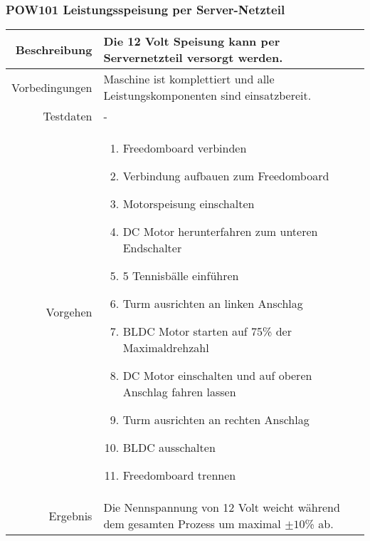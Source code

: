 \subsubsection{POW101 Leistungsspeisung per Server-Netzteil}
\begin{table}[h!]
	\renewcommand{\arraystretch}{1.5}
	\begin{tabular}{|r|p{13cm}|}
		\hline Beschreibung	&
			Die 12 Volt Speisung kann per Servernetzteil versorgt werden. \\ 
		\hline Vorbedingungen	&
			Maschine ist komplettiert und alle Leistungskomponenten
			sind einsatzbereit. \\ 
		\hline Testdaten	& - \\ 
		\hline Vorgehen		& 
		\begin{enumerate}
			\item Freedomboard verbinden
			\item Verbindung aufbauen zum Freedomboard
			\item Motorspeisung einschalten
			\item DC Motor herunterfahren zum unteren Endschalter
			\item 5 Tennisbälle einführen
			\item Turm ausrichten an linken Anschlag
			\item BLDC Motor starten auf 75\% der Maximaldrehzahl
			\item DC Motor einschalten und auf oberen Anschlag fahren lassen
			\item Turm ausrichten an rechten Anschlag
			\item BLDC ausschalten
			\item Freedomboard trennen
		\end{enumerate} \\ 
		\hline Ergebnis 	&
			Die Nennspannung von 12 Volt weicht während dem gesamten
			Prozess um maximal $\pm10$\% ab. \\ 
		\hline 
	\end{tabular}
\end{table}

\newpage
